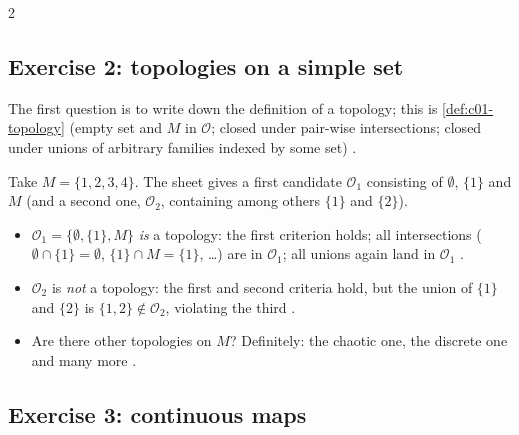 \begin{paracol}{2}
\subsection*{Exercise 2: topologies on a simple set}

The first question is to write down the definition of a topology; this is \cref{def:c01-topology} (empty set and $M$ in $\mathcal O$; closed under pair-wise intersections; closed under
unions of arbitrary families indexed by some set) .

Take $M=\{1,2,3,4\}$. The sheet gives a first candidate $\mathcal O_1$ consisting of $\emptyset$, $\{1\}$ and $M$ (and a second one, $\mathcal O_2$, containing among others $\{1\}$ and $\{2\}$).
\begin{itemize}
  \item $\mathcal O_1=\{\emptyset,\{1\},M\}$ \emph{is} a topology: the first criterion holds; all intersections ($\emptyset\cap\{1\}=\emptyset$, $\{1\}\cap M=\{1\}$, \dots) are in $\mathcal O_1$;
        all unions again land in $\mathcal O_1$ .
  \item $\mathcal O_2$ is \emph{not} a topology: the first and second criteria hold, but the union of $\{1\}$ and $\{2\}$ is $\{1,2\}\notin\mathcal O_2$, violating the third
        .
  \item Are there other topologies on $M$? Definitely: the chaotic one, the discrete one and many more .
\end{itemize}

\subsection*{Exercise 3: continuous maps}


\end{paracol}
